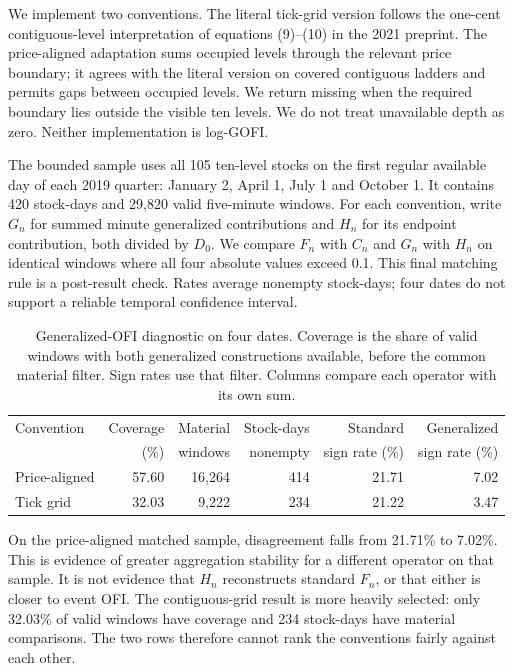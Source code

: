 \documentclass[11pt]{article}
\begin{document}
We implement two conventions. The literal tick-grid version follows the one-cent contiguous-level interpretation of equations (9)--(10) in the 2021 preprint. The price-aligned adaptation sums occupied levels through the relevant price boundary; it agrees with the literal version on covered contiguous ladders and permits gaps between occupied levels. We return missing when the required boundary lies outside the visible ten levels. We do not treat unavailable depth as zero. Neither implementation is log-GOFI.

The bounded sample uses all 105 ten-level stocks on the first regular available day of each 2019 quarter: January 2, April 1, July 1 and October 1. It contains 420 stock-days and 29,820 valid five-minute windows. For each convention, write $G_n$ for summed minute generalized contributions and $H_n$ for its endpoint contribution, both divided by $D_0$. We compare $F_n$ with $C_n$ and $G_n$ with $H_n$ on identical windows where all four absolute values exceed 0.1. This final matching rule is a post-result check. Rates average nonempty stock-days; four dates do not support a reliable temporal confidence interval.

\begin{table}[htbp]
\centering
\caption{Generalized-OFI diagnostic on four dates. Coverage is the share of valid windows with both generalized constructions available, before the common material filter. Sign rates use that filter. Columns compare each operator with its own sum.}
\label{tab:gofi}
\small
\setlength{\tabcolsep}{3pt}
\begin{tabular}{lrrrrr}
\toprule Convention&Coverage&Material&Stock-days&Standard&Generalized\\
 & (\%)&windows&nonempty&sign rate (\%)&sign rate (\%)\\\midrule
Price-aligned&57.60&16,264&414&21.71&7.02\\
Tick grid&32.03&9,222&234&21.22&3.47\\\bottomrule
\end{tabular}
\end{table}

On the price-aligned matched sample, disagreement falls from 21.71\% to 7.02\%. This is evidence of greater aggregation stability for a different operator on that sample. It is not evidence that $H_n$ reconstructs standard $F_n$, or that either is closer to event OFI. The contiguous-grid result is more heavily selected: only 32.03\% of valid windows have coverage and 234 stock-days have material comparisons. The two rows therefore cannot rank the conventions fairly against each other.
\end{document}
